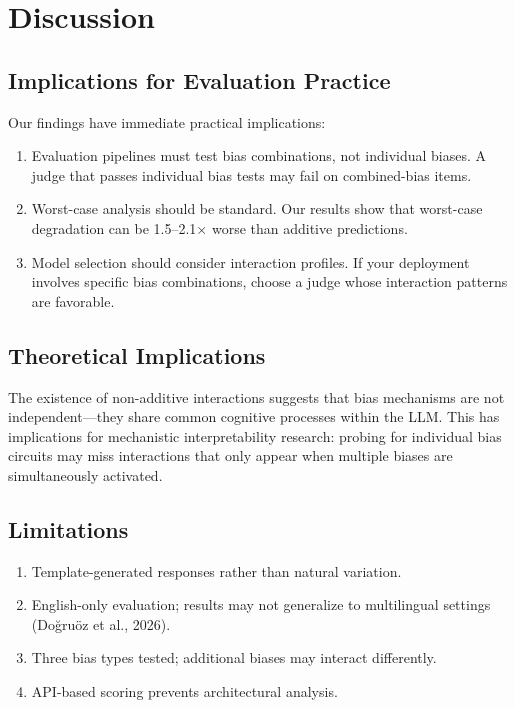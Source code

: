 \documentclass[11pt,twocolumn]{article}
\begin{document}
\section{Discussion}

\subsection{Implications for Evaluation Practice}

Our findings have immediate practical implications:
\begin{enumerate}
    \item Evaluation pipelines must test bias combinations, not individual biases. A judge that passes individual bias tests may fail on combined-bias items.
    \item Worst-case analysis should be standard. Our results show that worst-case degradation can be 1.5--2.1$\times$ worse than additive predictions.
    \item Model selection should consider interaction profiles. If your deployment involves specific bias combinations, choose a judge whose interaction patterns are favorable.
\end{enumerate}

\subsection{Theoretical Implications}

The existence of non-additive interactions suggests that bias mechanisms are not independent---they share common cognitive processes within the LLM. This has implications for mechanistic interpretability research: probing for individual bias circuits may miss interactions that only appear when multiple biases are simultaneously activated.

\subsection{Limitations}

\begin{enumerate}
    \item Template-generated responses rather than natural variation.
    \item English-only evaluation; results may not generalize to multilingual settings (Do\u{g}ru\"oz et al., 2026).
    \item Three bias types tested; additional biases may interact differently.
    \item API-based scoring prevents architectural analysis.
\end{enumerate}
\end{document}
